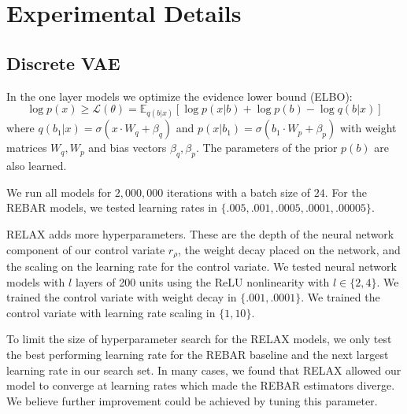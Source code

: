 \documentclass{article}
\newcommand{\E}{\mathbb{E}}
\begin{document}



\section{Experimental Details}
\label{experiment appendix}

\subsection{Discrete VAE}
\label{app_disc_vae}
In the one layer models we optimize the evidence lower bound (ELBO): $$\log p(x) \geq \mathcal{L}(\theta) = \E_{q(b|x)}[\log p(x|b) + \log p(b) - \log q(b|x)]$$ where $q(b_1|x) = \sigma(x\cdot W_q + \beta_q)$ and $p(x| b_1) = \sigma(b_1\cdot W_p + \beta_p)$ with weight matrices $W_q,W_p$ and bias vectors $\beta_q,\beta_p$.
The parameters of the prior $p(b)$ are also learned.

We run all models for $2,000,000$ iterations with a batch size of $24$. For the REBAR models, we tested learning rates in $\{.005, .001, .0005,  .0001, .00005\}$. 

RELAX adds more hyperparameters.
These are the depth of the neural network component of our control variate $r_\rho$, the weight decay placed on the network, and the scaling on the learning rate for the control variate.
We tested neural network models with $l$ layers of 200 units using the ReLU nonlinearity with $l \in \{2, 4\}$.
We trained the control variate with weight decay in $\{.001, .0001\}$. We trained the control variate with learning rate scaling in $\{1, 10\}$.

To limit the size of hyperparameter search for the RELAX models, we only test the best performing learning rate for the REBAR baseline and the next largest learning rate in our search set.
In many cases, we found that RELAX allowed our model to converge at learning rates which made the REBAR estimators diverge.
We believe further improvement could be achieved by tuning this parameter.
\end{document}
